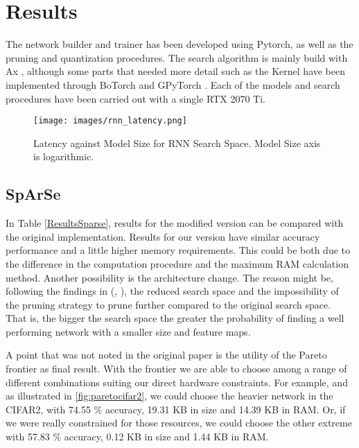 \documentclass[a4paper, twocolumn]{article}
\begin{document}
\section{Results}

The network builder and trainer has been developed using Pytorch, as well as the pruning and quantization procedures. The search algorithm is mainly build with Ax \cite{Bakshy2018a}, although some parts that needed more detail such as the Kernel have been implemented through BoTorch \cite{Balandat2019} and GPyTorch \cite{Gardner2018}. Each of the models and search procedures have been carried out with a single RTX 2070 Ti. 

\begin{figure}
	\centering
	\texttt{[image: images/rnn\_latency.png]}
	\caption{Latency against Model Size for RNN Search Space. Model Size axis is logarithmic.  }
	\label{fig:latency}
\end{figure}

\subsection{SpArSe}

In Table \ref{ResultsSparse}, results for the modified version can be compared with the original implementation. Results for our version have similar accuracy performance and a little higher memory requirements. This could be both due to the difference in the computation procedure and the maximum RAM calculation method. Another possibility is the architecture change. The reason might be, following the findings in (\cite{Frankle2019}, \cite{Cai2019f}), the reduced search space and the impossibility of the pruning strategy to prune further compared to the original search space. That is, the bigger the search space the greater the probability of finding a well performing network with a smaller size and feature maps. 

A point that was not noted in the original paper is the utility of the Pareto frontier as final result. With the frontier we are able to choose among a range of different combinations suiting our direct hardware constraints. For example, and as illustrated in \ref{fig:paretocifar2}, we could choose the heavier network in the CIFAR2, with 74.55 $\%$ accuracy, 19.31 KB in size and 14.39 KB in RAM. Or, if we were really constrained for those resources, we could choose the other extreme with 57.83 $\%$ accuracy, 0.12 KB  in size and 1.44 KB in RAM. 
\end{document}
